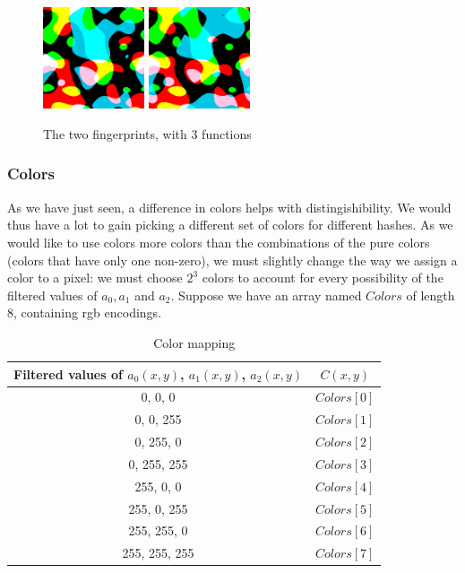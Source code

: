\documentclass{article}
\begin{document}
\begin{center}
\begin{figure}
    \centering
    \includegraphics[width=3cm]{figures/ThreeFuncs.png}
    \includegraphics[width=3cm]{figures/ThreeFuncsP67Psi0232.png}
    \caption{The two fingerprints, with 3 functions}
    \label{fig:threeFuncs}
\end{figure}
\end{center}

\subsubsection{Colors}

As we have just seen, a difference in colors helps with distingishibility. We would thus have a lot to gain picking a different set of colors for different hashes. As we would like to use colors more colors than the combinations of the pure colors (colors that have only one non-zero), we must slightly change the way we assign a color to a pixel: we must choose $2^3$ colors to account for every possibility of the filtered values of $a_0, a_1$ and $a_2$. Suppose we have an array named $Colors$ of length 8, containing rgb encodings.
\begin{table}
	\begin{center}
	\begin{tabular}{c|c}
		Filtered values of $a_0(x,y)$, $a_1(x,y)$, $a_2(x,y)$ & $C(x,y)$\\
		\hline 0,   0,   0 & $Colors[0]$\\
		 0,   0, 255 & $Colors[1]$\\
		 0, 255,   0 & $Colors[2]$\\
		 0, 255, 255 & $Colors[3]$\\
		 255,   0,   0 & $Colors[4]$\\
		 255,   0, 255 & $Colors[5]$\\
		 255, 255,   0 & $Colors[6]$\\
		255, 255, 255 & $Colors[7]$\\
	\end{tabular}
	\caption{Color mapping}
	\end{center}
\end{table}
\end{document}
